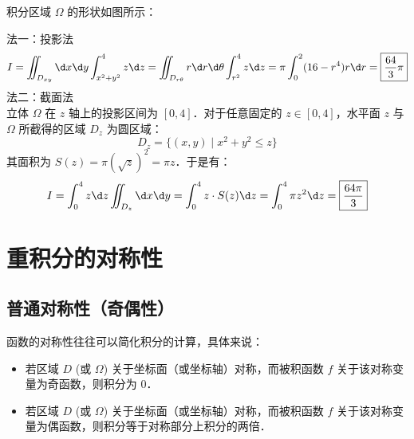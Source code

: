 \documentclass[12pt, a4paper, oneside, UTF8]{ctexbook}
\begin{document}
\begin{solution}
    积分区域 $\Omega$ 的形状如图所示：
    \begin{center}
    \end{center}
    法一：投影法\\
    \[ I = \iint_{D_{xy}} \d x\d y \int_{x^2+y^2}^{4} z \d z = \iint_{D_{r\theta}} r\d r\d \theta \int_{r^2}^{4} z \d z = \pi \int_0^2 (16 - r^4)r \d r =  \boxed{\frac{64}{3}\pi} \]
    法二：截面法\\
    立体 $\Omega$ 在 $z$ 轴上的投影区间为 $[0, 4]$．对于任意固定的 $z \in [0, 4]$，水平面 $z$ 与 $\Omega$ 所截得的区域 $D_z$ 为圆区域：
    \[ D_z = \{(x,y) \mid x^2 + y^2 \le z\} \]
    其面积为 $S(z) = \pi (\sqrt{z})^2 = \pi z$．于是有：
    \[ I = \int_0^4 z \d z \iint_{D_z} \d x \d y = \int_0^4 z \cdot S(z) \d z = \int_0^4 \pi z^2 \d z = \boxed{\frac{64\pi}{3}} \]
\end{solution}
\section{重积分的对称性}
\subsection{普通对称性（奇偶性）}
\begin{theorem}
    函数的对称性往往可以简化积分的计算，具体来说：
    \begin{itemize}
        \item 若区域 $D$ (或 $\Omega$) 关于坐标面（或坐标轴）对称，而被积函数 $f$ 关于该对称变量为奇函数，则积分为 0．
        \item 若区域 $D$ (或 $\Omega$) 关于坐标面（或坐标轴）对称，而被积函数 $f$ 关于该对称变量为偶函数，则积分等于对称部分上积分的两倍．
    \end{itemize}
\end{theorem}
\end{document}
